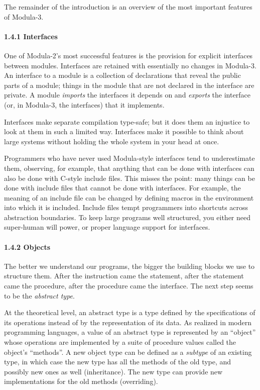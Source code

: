 \documentclass[10pt]{article}
\begin{document}
The remainder of the introduction is an overview of the most important
features of Modula-3.

\paragraph{1.4.1 Interfaces}

One of Modula-2's most successful features is the provision for explicit
interfaces between modules.  Interfaces are retained with essentially no
changes in Modula-3.  An interface to a module is a collection of declarations
that reveal the public parts of a module; things in the module that are not
declared in the interface are private.  A module \emph{imports} the interfaces
it depends on and \emph{exports} the interface (or, in Modula-3, the
interfaces) that it implements.

Interfaces make separate compilation type-safe; but it does them an injustice
to look at them in such a limited way.  Interfaces make it possible to think
about large systems without holding the whole system in your head at once.

Programmers who have never used Modula-style interfaces tend to underestimate
them, observing, for example, that anything that can be done with interfaces
can also be done with C-style include files.  This misses the point: many
things can be done with include files that cannot be done with interfaces.
For example, the meaning of an include file can be changed by defining macros
in the environment into which it is included.  Include files tempt programmers
into shortcuts across abstraction boundaries.  To keep large programs well
structured, you either need super-human will power, or proper language support
for interfaces.

\paragraph{1.4.2 Objects}

The better we understand our programs, the bigger the building blocks we use
to structure them.  After the instruction came the statement, after the
statement came the procedure, after the procedure came the interface.  The
next step seems to be the \emph{abstract type}.

At the theoretical level, an abstract type is a type defined by the
specifications of its operations instead of by the representation of its data.
As realized in modern programming languages, a value of an abstract type is
represented by an ``object'' whose operations are implemented by a suite of
procedure values called the object's ``methods''.  A new object type can be
defined as a \emph{subtype} of an existing type, in which case the new type
has all the methods of the old type, and possibly new ones as well
(inheritance).  The new type can provide new implementations for the old
methods (overriding).
\end{document}
